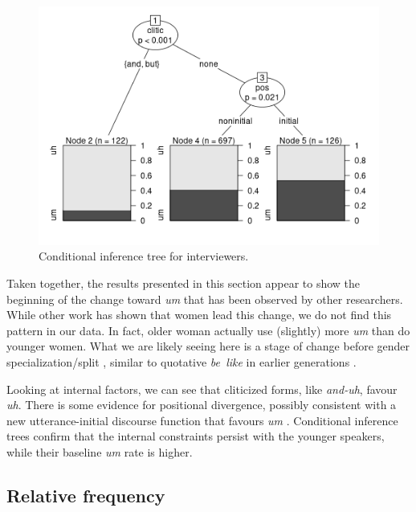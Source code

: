 \documentclass[11pt]{article}
\begin{document}
\begin{figure}[htpb]
    \centering
    \includegraphics[width=0.8\linewidth]{figures/ctreeinterviewers.png}
    \caption{Conditional inference tree for interviewers.}
    \label{fig:interviewertree}
\end{figure}

Taken together, the results presented in this section appear to show the
beginning of the change toward \emph{um} that has been observed by other
researchers.
While other work has shown that women lead this change, we do not find this
pattern in our data.
In fact, older woman actually use (slightly) more \emph{um} than do younger
women.
What we are likely seeing here is a stage of change before gender
specialization/split \parencite[308]{labov2001social}, similar to quotative
\emph{be~like} in earlier generations
\parencite[208--209]{tagliamontedarcy2007}.

Looking at internal factors, we can see that cliticized forms, like
\emph{and-uh}, favour \emph{uh}.
There is some evidence for positional divergence, possibly consistent with a new
utterance-initial discourse function that favours \emph{um}
\parencite[cf.][, who found no turn-positional difference]{fruehwald2016}.
Conditional inference trees confirm that the internal constraints persist with
the younger speakers, while their baseline \emph{um} rate is higher.


\subsection{Relative frequency}
\end{document}
